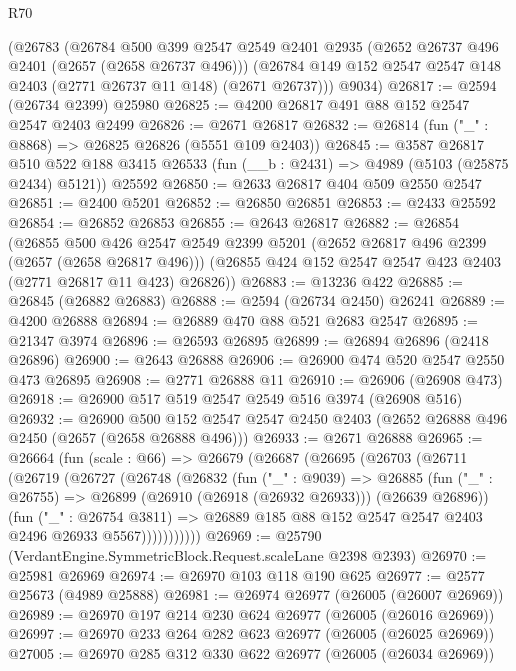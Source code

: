 \begin{lexlean}{R70}
\begin{coremodule}
    (@26783
      (@26784
        @500
        @399
        @2547
        @2549
        @2401
        @2935
        (@2652 @26737 @496 @2401 (@2657 (@2658 @26737 @496)))
        (@26784 @149 @152 @2547 @2547 @148 @2403 (@2771 @26737 @11 @148) (@2671 @26737)))
      @9034)
@26817 := @2594 (@26734 @2399) @25980
@26825 := @4200 @26817 @491 @88 @152 @2547 @2547 @2403 @2499
@26826 := @2671 @26817
@26832 := @26814 (fun ("_" : @8868) => @26825 @26826 (@5551 @109 @2403))
@26845 := @3587
    @26817
    @510
    @522
    @188
    @3415
    @26533
    (fun (__b : @2431) => @4989 (@5103 (@25875 @2434) @5121))
    @25592
@26850 := @2633 @26817 @404 @509 @2550 @2547
@26851 := @2400 @5201
@26852 := @26850 @26851
@26853 := @2433 @25592
@26854 := @26852 @26853
@26855 := @2643 @26817
@26882 := @26854
    (@26855
      @500
      @426
      @2547
      @2549
      @2399
      @5201
      (@2652 @26817 @496 @2399 (@2657 (@2658 @26817 @496)))
      (@26855 @424 @152 @2547 @2547 @423 @2403 (@2771 @26817 @11 @423) @26826))
@26883 := @13236 @422
@26885 := @26845 (@26882 @26883)
@26888 := @2594 (@26734 @2450) @26241
@26889 := @4200 @26888
@26894 := @26889 @470 @88 @521 @2683 @2547
@26895 := @21347 @3974
@26896 := @26593 @26895
@26899 := @26894 @26896 (@2418 @26896)
@26900 := @2643 @26888
@26906 := @26900 @474 @520 @2547 @2550 @473 @26895
@26908 := @2771 @26888 @11
@26910 := @26906 (@26908 @473)
@26918 := @26900 @517 @519 @2547 @2549 @516 @3974 (@26908 @516)
@26932 := @26900
    @500
    @152
    @2547
    @2547
    @2450
    @2403
    (@2652 @26888 @496 @2450 (@2657 (@2658 @26888 @496)))
@26933 := @2671 @26888
@26965 := @26664
    (fun (scale : @66) =>
    @26679
      (@26687
        (@26695
          (@26703
            (@26711
              (@26719
                (@26727
                  (@26748
                    (@26832
                      (fun ("_" : @9039) =>
                      @26885
                        (fun ("_" : @26755) =>
                        @26899 (@26910 (@26918 (@26932 @26933))) (@26639 @26896))
                        (fun ("_" : @26754 @3811) =>
                        @26889 @185 @88 @152 @2547 @2547 @2403 @2496 @26933 @5567)))))))))))
@26969 := @25790 (VerdantEngine.SymmetricBlock.Request.scaleLane @2398 @2393)
@26970 := @25981 @26969
@26974 := @26970 @103 @118 @190 @625
@26977 := @2577 @25673 (@4989 @25888)
@26981 := @26974 @26977 (@26005 (@26007 @26969))
@26989 := @26970 @197 @214 @230 @624 @26977 (@26005 (@26016 @26969))
@26997 := @26970 @233 @264 @282 @623 @26977 (@26005 (@26025 @26969))
@27005 := @26970 @285 @312 @330 @622 @26977 (@26005 (@26034 @26969))

\end{coremodule}
\end{lexlean}
